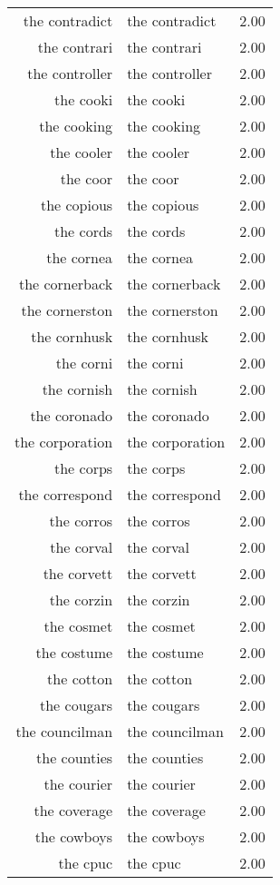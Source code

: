 \begin{table}[ht]
\begin{tabular}{rlr}
  the contradict & the contradict & 2.00 \\ 
  the contrari & the contrari & 2.00 \\ 
  the controller & the controller & 2.00 \\ 
  the cooki & the cooki & 2.00 \\ 
  the cooking & the cooking & 2.00 \\ 
  the cooler & the cooler & 2.00 \\ 
  the coor & the coor & 2.00 \\ 
  the copious & the copious & 2.00 \\ 
  the cords & the cords & 2.00 \\ 
  the cornea & the cornea & 2.00 \\ 
  the cornerback & the cornerback & 2.00 \\ 
  the cornerston & the cornerston & 2.00 \\ 
  the cornhusk & the cornhusk & 2.00 \\ 
  the corni & the corni & 2.00 \\ 
  the cornish & the cornish & 2.00 \\ 
  the coronado & the coronado & 2.00 \\ 
  the corporation & the corporation & 2.00 \\ 
  the corps & the corps & 2.00 \\ 
  the correspond & the correspond & 2.00 \\ 
  the corros & the corros & 2.00 \\ 
  the corval & the corval & 2.00 \\ 
  the corvett & the corvett & 2.00 \\ 
  the corzin & the corzin & 2.00 \\ 
  the cosmet & the cosmet & 2.00 \\ 
  the costume & the costume & 2.00 \\ 
  the cotton & the cotton & 2.00 \\ 
  the cougars & the cougars & 2.00 \\ 
  the councilman & the councilman & 2.00 \\ 
  the counties & the counties & 2.00 \\ 
  the courier & the courier & 2.00 \\ 
  the coverage & the coverage & 2.00 \\ 
  the cowboys & the cowboys & 2.00 \\ 
  the cpuc & the cpuc & 2.00 \\ 

\end{tabular}
\end{table}
